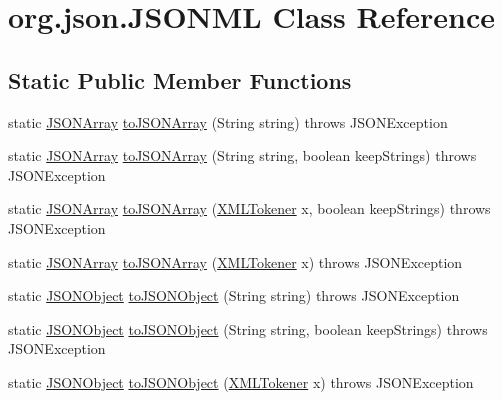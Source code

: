 \hypertarget{classorg_1_1json_1_1JSONML}{\section{org.\-json.\-J\-S\-O\-N\-M\-L Class Reference}
\label{classorg_1_1json_1_1JSONML}
}
\subsection*{Static Public Member Functions}
\begin{DoxyCompactItemize}
\item 
static \hyperlink{classorg_1_1json_1_1JSONArray}{J\-S\-O\-N\-Array} \hyperlink{classorg_1_1json_1_1JSONML_a97e622e1f610e21ba5cbd3167d4fb5a1}{to\-J\-S\-O\-N\-Array} (String string)  throws J\-S\-O\-N\-Exception 
\item 
static \hyperlink{classorg_1_1json_1_1JSONArray}{J\-S\-O\-N\-Array} \hyperlink{classorg_1_1json_1_1JSONML_abbd02d23e1a31f67521b5c43adfff065}{to\-J\-S\-O\-N\-Array} (String string, boolean keep\-Strings)  throws J\-S\-O\-N\-Exception 
\item 
static \hyperlink{classorg_1_1json_1_1JSONArray}{J\-S\-O\-N\-Array} \hyperlink{classorg_1_1json_1_1JSONML_a5c079d243049461cc42fa0911af5ded5}{to\-J\-S\-O\-N\-Array} (\hyperlink{classorg_1_1json_1_1XMLTokener}{X\-M\-L\-Tokener} x, boolean keep\-Strings)  throws J\-S\-O\-N\-Exception 
\item 
static \hyperlink{classorg_1_1json_1_1JSONArray}{J\-S\-O\-N\-Array} \hyperlink{classorg_1_1json_1_1JSONML_a82cc8221f4feee054e12a5689a2186f4}{to\-J\-S\-O\-N\-Array} (\hyperlink{classorg_1_1json_1_1XMLTokener}{X\-M\-L\-Tokener} x)  throws J\-S\-O\-N\-Exception 
\item 
static \hyperlink{classorg_1_1json_1_1JSONObject}{J\-S\-O\-N\-Object} \hyperlink{classorg_1_1json_1_1JSONML_aa517a2c5f1930ae22619425098e55f41}{to\-J\-S\-O\-N\-Object} (String string)  throws J\-S\-O\-N\-Exception 
\item 
static \hyperlink{classorg_1_1json_1_1JSONObject}{J\-S\-O\-N\-Object} \hyperlink{classorg_1_1json_1_1JSONML_a5e4cd4993b426b1d03b640769b7df135}{to\-J\-S\-O\-N\-Object} (String string, boolean keep\-Strings)  throws J\-S\-O\-N\-Exception 
\item 
static \hyperlink{classorg_1_1json_1_1JSONObject}{J\-S\-O\-N\-Object} \hyperlink{classorg_1_1json_1_1JSONML_a9075449699e2ebca8721a6bdf04ee35f}{to\-J\-S\-O\-N\-Object} (\hyperlink{classorg_1_1json_1_1XMLTokener}{X\-M\-L\-Tokener} x)  throws J\-S\-O\-N\-Exception 

\end{DoxyCompactItemize}
